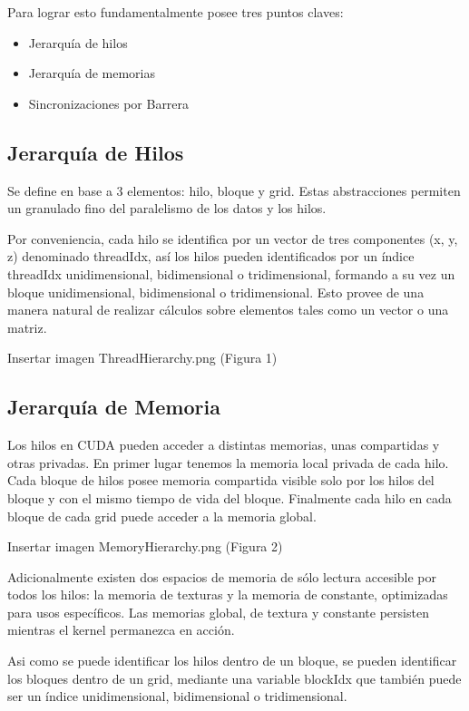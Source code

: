 \documentclass[twoside]{article}
\begin{document}
Para lograr esto fundamentalmente posee tres puntos claves:

\begin{itemize}
   \item Jerarquía de hilos
   \item Jerarquía de memorias
   \item Sincronizaciones por Barrera
\end{itemize}

\subsection{Jerarquía de Hilos}

Se define en base a 3 elementos: hilo, bloque y grid. Estas abstracciones permiten un granulado fino del paralelismo de los datos y los hilos.

Por conveniencia, cada hilo se identifica por un vector de tres componentes (x, y, z) denominado threadIdx, así los hilos pueden identificados por un índice threadIdx unidimensional, bidimensional o tridimensional, formando a su vez un bloque unidimensional, bidimensional o tridimensional. Esto provee de una manera natural de realizar cálculos sobre elementos tales como un vector o una matriz.

Insertar imagen ThreadHierarchy.png (Figura 1)

\subsection{Jerarquía de Memoria}

Los hilos en CUDA pueden acceder a distintas memorias, unas compartidas y otras privadas. En primer lugar tenemos la memoria local privada de cada hilo. Cada bloque de hilos posee memoria compartida visible solo por los hilos del bloque y con el mismo tiempo de vida del bloque. Finalmente cada hilo en cada bloque de cada grid puede acceder a la memoria global.

Insertar imagen MemoryHierarchy.png (Figura 2)

Adicionalmente existen dos espacios de memoria de sólo lectura accesible por todos los hilos: la memoria de texturas y la memoria de constante, optimizadas para usos específicos. Las memorias global, de textura y constante persisten mientras el kernel permanezca en acción.

Asi como se puede identificar los hilos dentro de un bloque, se pueden identificar los bloques dentro de un grid, mediante una variable blockIdx que también puede ser un índice unidimensional, bidimensional o tridimensional.
\end{document}
